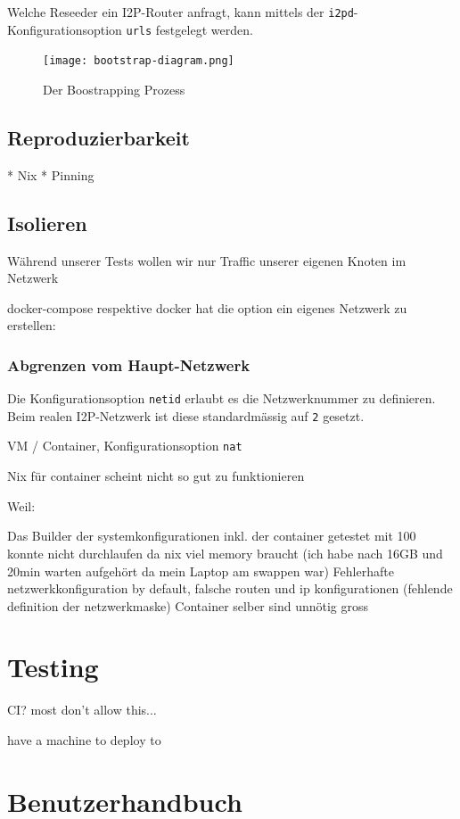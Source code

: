 Welche Reseeder ein I2P-Router anfragt, kann mittels der \lstinline|i2pd|-Konfigurationsoption \lstinline|urls| festgelegt werden.


\clearpage
\begin{landscape}%
\begin{figure}[ht]
  \texttt{[image: bootstrap-diagram.png]}
  \caption{Der Boostrapping Prozess}\label{fig:bootstrap-diagram}
\end{figure}
\end{landscape}%


\subsection{Reproduzierbarkeit}

* Nix
* Pinning
    
\cite{noauthor_nixops_nodate-5}


\subsection{Isolieren}

Während unserer Tests wollen wir nur Traffic unserer eigenen Knoten im Netzwerk 

docker-compose respektive docker hat die option ein eigenes Netzwerk zu erstellen:

\subsubsection{Abgrenzen vom Haupt-Netzwerk}

Die Konfigurationsoption \lstinline|netid| erlaubt es die Netzwerknummer zu definieren.
Beim realen I2P-Netzwerk ist diese standardmässig auf \lstinline|2| gesetzt.

VM / Container, Konfigurationsoption \lstinline|nat|

Nix für container scheint nicht so gut zu funktionieren

Weil:

Das Builder der systemkonfigurationen inkl. der container getestet mit 100 konnte nicht durchlaufen da nix viel memory braucht (ich habe nach 16GB und 20min warten aufgehört da mein Laptop am swappen war)
Fehlerhafte netzwerkkonfiguration by default, falsche routen und ip konfigurationen (fehlende definition der netzwerkmaske)
Container selber sind unnötig gross

\section{Testing}

CI? most don't allow this...

have a machine to deploy to

\section{Benutzerhandbuch}


